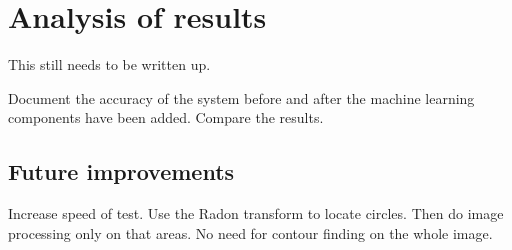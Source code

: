 \chapter{Analysis of results}
\label{ch:Results}
\ifpdf
\graphicspath{{Chapter5/Chapter5Figures/}}
\fi

This still needs to be written up.

Document the accuracy of the system before and after the machine learning components have been added. Compare the results.

\section{Future improvements}

Increase speed of test. Use the Radon transform to locate circles. Then do image processing only on that areas. No need for contour finding on the whole image.